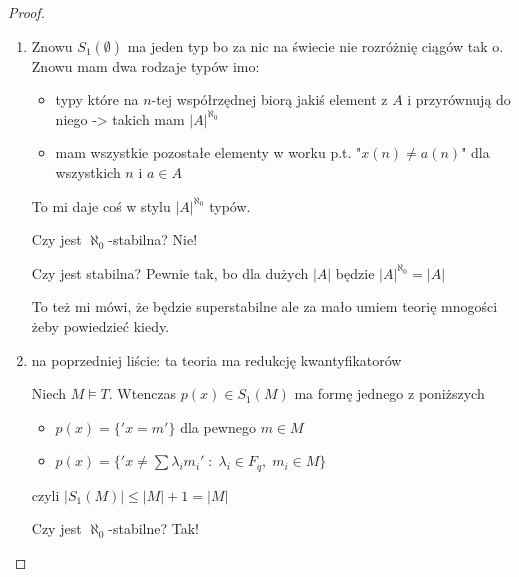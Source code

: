 \begin{proof}
\begin{enumerate}
    \item Znowu $S_1(\emptyset)$ ma jeden typ bo za nic na świecie nie rozróżnię ciągów tak o. Znowu mam dwa rodzaje typów imo:
      \begin{itemize}
        \item typy które na $n$-tej współrzędnej biorą jakiś element z $A$ i przyrównują do niego -> takich mam $|A|^{\aleph_0}$ 
        \item mam wszystkie pozostałe elementy w worku p.t. "$x(n)\neq a(n)$" dla wszystkich $n$ i $a\in A$
      \end{itemize}
      To mi daje coś w stylu $|A|^{\aleph_0}$ typów.
      
      Czy jest $\aleph_0$-stabilna? Nie!

      Czy jest stabilna? Pewnie tak, bo dla dużych $|A|$ będzie $|A|^{\aleph_0}=|A|$

      To też mi mówi, że będzie superstabilne ale za mało umiem teorię mnogości żeby powiedzieć kiedy.

    \item na poprzedniej liście: ta teoria ma redukcję kwantyfikatorów

      Niech $M\models T$. Wtenczas $p(x)\in S_1(M)$ ma formę jednego z poniższych
      \begin{itemize}
        \item $p(x)=\{'x=m'\}$ dla pewnego $m\in M$
        \item $p(x)=\{'x\neq\sum\lambda_im_i'\;:\;\lambda_i\in F_q,\;m_i\in M\}$
      \end{itemize}
      czyli $|S_1(M)|\leq |M|+1=|M|$


      Czy jest $\aleph_0$-stabilne? Tak!


\end{enumerate}
\end{proof}
